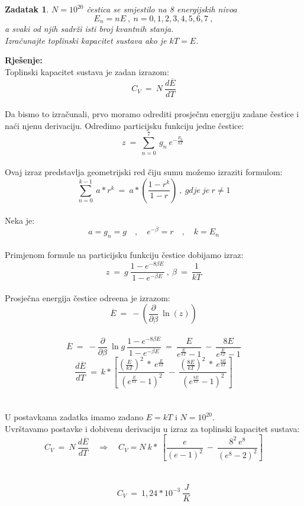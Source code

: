 \documentclass[a4paper,12pt]{article}
\newtheorem{ZDK}{Zadatak}[section]
\begin{document}
\newpage
\begin{ZDK}
	$N=10^{20}$ \v{c}estica se smjestilo na 8 energijskih nivoa
	$$ E_n=nE\ ,\ n=0,1,2,3,4,5,6,7\ , $$
	a svaki od njih sadr\v{z}i isti broj kvantnih stanja. \\
	Izra\v{c}unajte toplinski kapacitet sustava ako je $kT=E$.
\end{ZDK}
\textbf{Rje\v{s}enje:} \\
\newline
Toplinski kapacitet sustava je zadan izrazom:
$$ C_V\ =\ N\ \frac{d \overline{E}}{dT} $$
\\
Da bismo to izra\v{c}unali, prvo moramo odrediti prosje\v{c}nu energiju zadane \v{c}estice i na\'ci njenu derivaciju.
Odredimo particijsku funkciju jedne \v{c}estice:
\\
$$ z\ =\ \sum_{n=0}^{7}\ g_n\ e^{-\frac{E_n}{kT}}\ $$
\\
Ovaj izraz predstavlja geometrijski red \v{c}iju sumu mo\v{z}emo izraziti formulom:
$$ \sum_{n=0}^{k-1}\ a*r^k\ =\ a* \left( \frac{1-r^k}{1-r} \right)\ ,\ gdje\ je\ r \neq 1 $$
\\
Neka je:
$$ a=g_n=g \quad , \quad e^{- \beta}=r \quad , \quad k=E_n $$
\\
Primjenom formule na particijsku funkciju \v{c}estice dobijamo izraz:
$$ z\ =\ g\ \frac{1-e^{-8 \beta E}}{1-e^{- \beta E}}\ ,\ \beta\ =\ \frac{1}{kT} $$
\\
Prosje\v{c}na energija \v{c}estice odre\dj ena je izrazom:
$$ \overline{E}\ =\ - \left( \frac{\partial}{\partial \beta}\ \ln(z) \right) $$
\\
$$ \overline{E}\ =\ - \frac{\partial}{\partial \beta}\ \ln g\ \frac{1-e^{-8 \beta E}}{1-e^{- \beta E}}\ =\ \frac{E}{e^{\frac{E}{kT}}-1}\ -\ \frac{8E}{e^{\frac{E}{kT}}-1} $$
\newpage
$$ \frac{d \overline{E}}{dT}\ =\ k*\left[ \frac{\left( \frac{E}{kT} \right)^2\ *\ e^{\frac{E}{kT}}}{ \left( e^{\frac{E}{kT}}-1 \right)^2}\ -\ 
\frac{ \left( \frac{8E}{kT} \right)^2\ *\ e^{\frac{8E}{kT}}}{\left( e^{\frac{8E}{kT}}-1 \right)^2}  \right]  $$
\\
\\
U postavkama zadatka imamo zadano $E=kT$ i $N=10^{20}$. \\
Uvr\v{s}tavamo postavke i dobivenu derivaciju u izraz za toplinski kapacitet sustava:
\\
$$ C_V\ =\ N\ \frac{d \overline{E}}{dT} \quad \Rightarrow \quad C_V=N\ k*\ \left[ \frac{e}{(e-1)^2}\ -\ \frac{8^2\ e^8}{(e^8-2)^2} \right] $$
\\
\\
$$ C_V\ =\ 1,24*10^{-3}\ \frac{J}{K} $$
\end{document}
